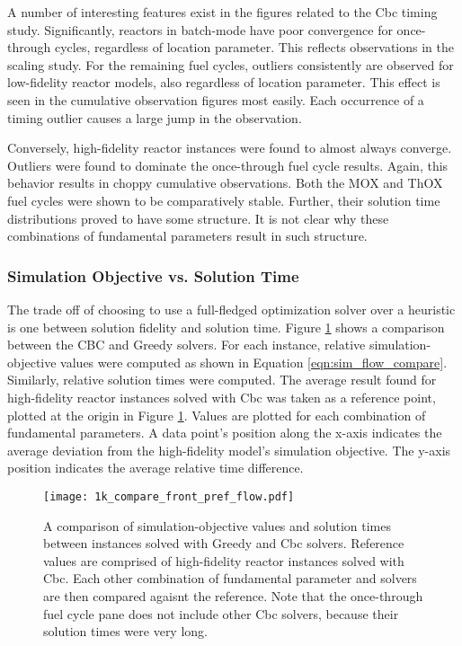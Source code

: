 A number of interesting features exist in the figures related to the Cbc timing
study. Significantly, reactors in batch-mode have poor convergence for
once-through cycles, regardless of location parameter. This reflects
observations in the scaling study. For the remaining fuel cycles, outliers
consistently are observed for low-fidelity reactor models, also regardless of
location parameter. This effect is seen in the cumulative observation figures
most easily. Each occurrence of a timing outlier causes a large jump in the
observation. 

Conversely, high-fidelity reactor instances were found to almost always
converge. Outliers were found to dominate the once-through fuel cycle
results. Again, this behavior results in choppy cumulative observations. Both
the MOX and ThOX fuel cycles were shown to be comparatively stable. Further,
their solution time distributions proved to have some structure. It is not clear
why these combinations of fundamental parameters result in such structure.

\subsubsection{Simulation Objective vs. Solution Time}

The trade off of choosing to use a full-fledged optimization solver over a
heuristic is one between solution fidelity and solution time. Figure
\ref{fig:1k_compare_front_pref_flow} shows a comparison between the CBC and
Greedy solvers. For each instance, relative simulation-objective values were
computed as shown in Equation \ref{eqn:sim_flow_compare}. Similarly, relative
solution times were computed. The average result found for high-fidelity reactor
instances solved with Cbc was taken as a reference point, plotted at the origin
in Figure \ref{fig:1k_compare_front_pref_flow}. Values are plotted for each
combination of fundamental parameters. A data point's position along the x-axis
indicates the average deviation from the high-fidelity model's simulation
objective. The y-axis position indicates the average relative time difference.

\begin{figure}[h!]
  \begin{center}
    \texttt{[image: 1k\_compare\_front\_pref\_flow.pdf]}
    \caption{
      \label{fig:1k_compare_front_pref_flow}
      A comparison of simulation-objective values and solution times between
      instances solved with Greedy and Cbc solvers. Reference values are
      comprised of high-fidelity reactor instances solved with Cbc. Each other
      combination of fundamental parameter and solvers are then compared agaisnt
      the reference. Note that the once-through fuel cycle pane does not include
      other Cbc solvers, because their solution times were very long.
    }
  \end{center}
\end{figure}

